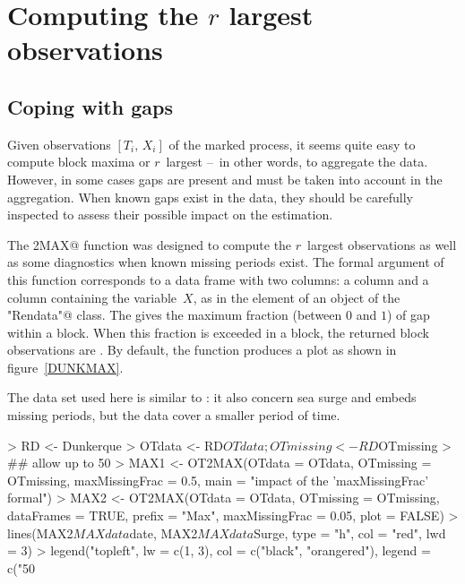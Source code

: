 \documentclass[a4paper]{report}
\begin{document}


\section{Computing the $r$ largest observations}
\label{OT2MAX}

\subsection{Coping with gaps}
Given observations $[T_i,\,X_i]$ of the marked process, it seems quite
easy to compute block maxima or $r$~largest --~in other words, to
aggregate the data.  However, in some cases gaps are present and must
be taken into account in the aggregation. When known gaps exist in the
data, they should be carefully inspected to assess their possible 
impact on the estimation. 

The \verb@OT2MAX@ function was designed to compute the $r$~largest
observations as well as some diagnostics when known missing periods
exist. The formal argument \verb@OTdata@ of this function corresponds
to a data frame with two columns: a \verb@date@ column and a column
containing the variable~$X$, as in the \verb@OTdata@ element of an
object of the \verb@"Rendata"@ class. The \verb@maxMissingFrac@ gives
the maximum fraction (between $0$ and $1$) of gap within a block. When
this fraction is exceeded in a block, the returned block observations are
\verb@NA@.  By default, the function produces a plot as shown in figure~\ref{DUNKMAX}. 

The \verb@Dunkerque@ data set used here is similar to \verb@Brest@:
it also concern sea surge and embeds missing periods, but the data
cover a smaller period of time.


\begin{Schunk}
\begin{Sinput}
> RD <- Dunkerque
> OTdata <- RD$OTdata; OTmissing <- RD$OTmissing
> ## allow up to 50%
> MAX1 <- OT2MAX(OTdata = OTdata, OTmissing = OTmissing,
                 maxMissingFrac = 0.5,
                 main = "impact of the 'maxMissingFrac' formal")
> MAX2 <- OT2MAX(OTdata = OTdata, OTmissing = OTmissing, dataFrames = TRUE,
                 prefix = "Max", maxMissingFrac = 0.05, plot = FALSE)
> lines(MAX2$MAXdata$date, MAX2$MAXdata$Surge, type = "h", col = "red", lwd = 3)
> legend("topleft", lw = c(1, 3), col = c("black", "orangered"),
         legend = c("50%
\end{Sinput}
\end{Schunk}
\end{document}
